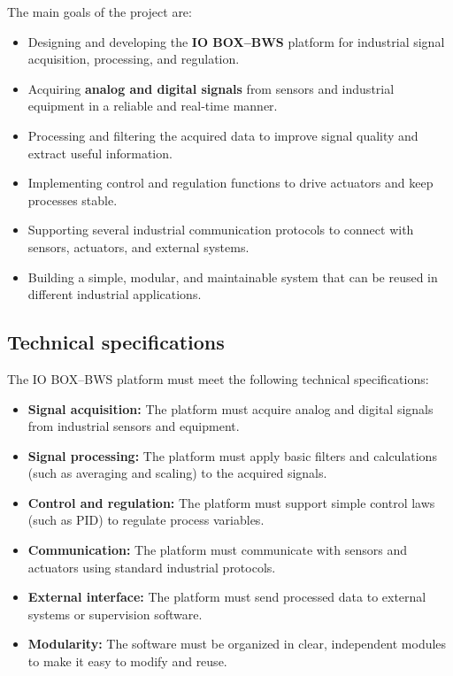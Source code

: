\hspace{1cm}
The main goals of the project are:
\begin{itemize}
    \item Designing and developing the \textbf{IO BOX–BWS} platform for industrial signal acquisition, processing, and regulation.
    \item Acquiring \textbf{analog and digital signals} from sensors and industrial equipment in a reliable and real‑time manner.
    \item Processing and filtering the acquired data to improve signal quality and extract useful information.
    \item Implementing control and regulation functions to drive actuators and keep processes stable.
    \item Supporting several industrial communication protocols to connect with sensors, actuators, and external systems.
    \item Building a simple, modular, and maintainable system that can be reused in different industrial applications.
\end{itemize}

\subsection{Technical specifications}
\hspace{1cm}
The IO BOX–BWS platform must meet the following technical specifications:
\begin{itemize}
    \item \textbf{Signal acquisition:} The platform must acquire analog and digital signals from industrial sensors and equipment.
    \item \textbf{Signal processing:} The platform must apply basic filters and calculations (such as averaging and scaling) to the acquired signals.
    \item \textbf{Control and regulation:} The platform must support simple control laws (such as PID) to regulate process variables.
    \item \textbf{Communication:} The platform must communicate with sensors and actuators using standard industrial protocols.
    \item \textbf{External interface:} The platform must send processed data to external systems or supervision software.
    \item \textbf{Modularity:} The software must be organized in clear, independent modules to make it easy to modify and reuse.
\end{itemize}